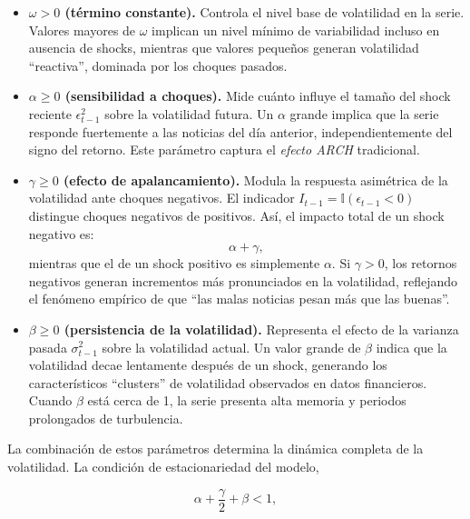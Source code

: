 \documentclass[
]{ceurart}
\begin{document}
\begin{itemize}

    \item \textbf{$\omega > 0$ (término constante).}
    Controla el nivel base de volatilidad en la serie.
    Valores mayores de $\omega$ implican un nivel mínimo de variabilidad incluso en ausencia de shocks,
    mientras que valores pequeños generan volatilidad “reactiva”, dominada por los choques pasados.

    \item \textbf{$\alpha \ge 0$ (sensibilidad a choques).}
    Mide cuánto influye el tamaño del shock reciente $\epsilon_{t-1}^2$ sobre la volatilidad futura.
    Un $\alpha$ grande implica que la serie responde fuertemente a las noticias del día anterior,
    independientemente del signo del retorno.
    Este parámetro captura el \textit{efecto ARCH} tradicional.

    \item \textbf{$\gamma \ge 0$ (efecto de apalancamiento).}
    Modula la respuesta asimétrica de la volatilidad ante choques negativos.
    El indicador $I_{t-1} = \mathbb{I}(\epsilon_{t-1} < 0)$ distingue choques negativos de positivos.
    Así, el impacto total de un shock negativo es:
    \[
        \alpha + \gamma,
    \]
    mientras que el de un shock positivo es simplemente $\alpha$.
    Si $\gamma > 0$, los retornos negativos generan incrementos más pronunciados en la volatilidad,
    reflejando el fenómeno empírico de que ``las malas noticias pesan más que las buenas''.

    \item \textbf{$\beta \ge 0$ (persistencia de la volatilidad).}
    Representa el efecto de la varianza pasada $\sigma_{t-1}^2$ sobre la volatilidad actual.
    Un valor grande de $\beta$ indica que la volatilidad decae lentamente después de un shock,
    generando los característicos ``clusters'' de volatilidad observados en datos financieros.
    Cuando $\beta$ está cerca de 1, la serie presenta alta memoria y periodos prolongados de turbulencia.

\end{itemize}

La combinación de estos parámetros determina la dinámica completa de la volatilidad.
La condición de estacionariedad del modelo,

\begin{equation}
    \alpha + \frac{\gamma}{2} + \beta < 1,
\end{equation}
\end{document}

